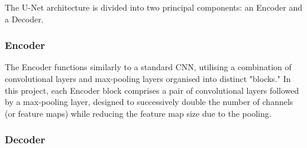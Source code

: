 \documentclass[12pt]{article}
\begin{document}






The U-Net architecture is divided into two principal components: an Encoder and a Decoder. 

\subsubsection*{Encoder}


The Encoder functions similarly to a standard CNN, utilising a combination of convolutional layers and max-pooling layers organised into distinct "blocks." In this project, each Encoder block comprises a pair of convolutional layers followed by a max-pooling layer, designed to successively double the number of channels (or feature maps) while 
reducing the feature map size due to the pooling.




\subsubsection*{Decoder}

\end{document}
